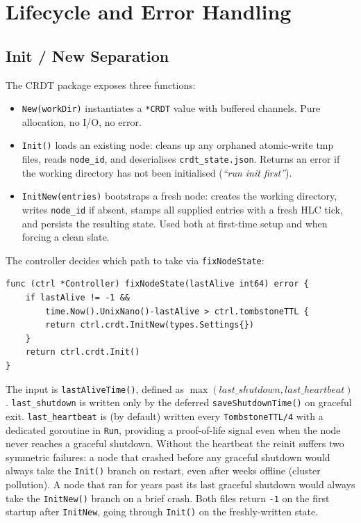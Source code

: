 \documentclass[conference]{IEEEtran}
\begin{document}
\section{Lifecycle and Error Handling}
\label{sec:lifecycle}

\subsection{Init / New Separation}

The CRDT package exposes three functions:
\begin{itemize}
  \item \texttt{New(workDir)} instantiates a \texttt{*CRDT} value with
    buffered channels. Pure allocation, no I/O, no error.
  \item \texttt{Init()} loads an existing node: cleans up any orphaned
    atomic-write tmp files, reads \texttt{node\_id}, and deserialises
    \texttt{crdt\_state.json}. Returns an error if the working directory
    has not been initialised (\emph{``run init first''}).
  \item \texttt{InitNew(entries)} bootstraps a fresh node: creates the
    working directory, writes \texttt{node\_id} if absent, stamps all
    supplied entries with a fresh HLC tick, and persists the resulting
    state. Used both at first-time setup and when forcing a clean slate.
\end{itemize}

The controller decides which path to take via \texttt{fixNodeState}:

\begin{lstlisting}
func (ctrl *Controller) fixNodeState(lastAlive int64) error {
    if lastAlive != -1 &&
        time.Now().UnixNano()-lastAlive > ctrl.tombstoneTTL {
        return ctrl.crdt.InitNew(types.Settings{})
    }
    return ctrl.crdt.Init()
}
\end{lstlisting}

The input is \texttt{lastAliveTime()}, defined as
$\max(last\_shutdown, last\_heartbeat)$.
\texttt{last\_shutdown} is written only by the deferred
\texttt{saveShutdownTime()} on graceful exit. \texttt{last\_heartbeat} is
(by default) written every \texttt{TombstoneTTL/4} with a dedicated goroutine in
\texttt{Run}, providing a proof-of-life signal even when the node
never reaches a graceful shutdown. Without the heartbeat the reinit
suffers two symmetric failures: a node that crashed before any
graceful shutdown would always take the \texttt{Init()} branch on restart,
even after weeks offline (cluster pollution). A node that ran for years past
its last graceful shutdown would always take the \texttt{InitNew()} branch
on a brief crash. Both files return \texttt{-1} on the first startup after
\texttt{InitNew}, going through \texttt{Init()}
on the freshly-written state.
\end{document}

